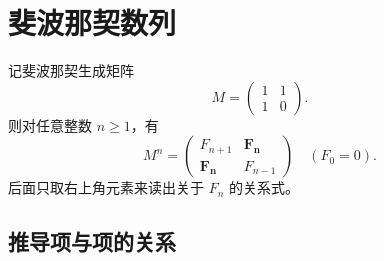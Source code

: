 \chapter{斐波那契数列}
记斐波那契生成矩阵
\[
M = \begin{pmatrix} 1 & 1 \\ 1 & 0 \end{pmatrix}.
\]
则对任意整数 \(n\ge 1\)，有
\[
M^n = \begin{pmatrix} F_{n+1} & \mathbf{F_n} \\ \mathbf{F_n} & F_{n-1} \end{pmatrix}
\quad (F_0=0).
\]
后面只取右上角元素来读出关于 \(F_n\) 的关系式。
\section{推导项与项的关系}
